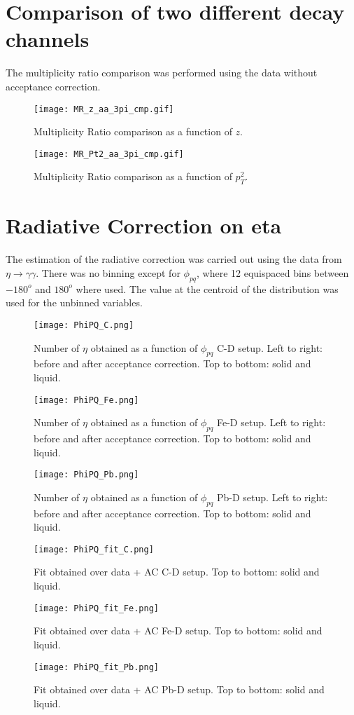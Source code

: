 \section{Comparison of two different decay channels}
The multiplicity ratio comparison was performed using the data without acceptance correction.
%
\begin{figure}[H]
\centering
\texttt{[image: MR\_z\_aa\_3pi\_cmp.gif]}
\caption{Multiplicity Ratio comparison as a function of $z$.}
\label{fig:MR_eta_cmp_z}
\end{figure}
%
\begin{figure}[H]
\centering
\texttt{[image: MR\_Pt2\_aa\_3pi\_cmp.gif]}
\caption{Multiplicity Ratio comparison as a function of $p_T^2$.}
\label{fig:MR_eta_cmp_pt2}
\end{figure}

\section{Radiative Correction on eta}
The estimation of the radiative correction was carried out using the data from $\eta \rightarrow \gamma\gamma$. There was no binning except for $\phi_{pq}$, where 12 equispaced bins between $-180^o$ and $180^o$ where used. The value at the centroid of the distribution was used for the unbinned variables. 

\begin{figure}[H]
\centering
\texttt{[image: PhiPQ\_C.png]}
\caption{Number of $\eta$ obtained as a function of $\phi_{pq}$ C-D setup. Left to right: before and after acceptance correction. Top to bottom: solid and liquid.}
\label{fig:Nh_eta_aa_phipq_C}
\end{figure}
%
\begin{figure}[H]
\centering
\texttt{[image: PhiPQ\_Fe.png]}
\caption{Number of $\eta$ obtained as a function of $\phi_{pq}$ Fe-D setup. Left to right: before and after acceptance correction. Top to bottom: solid and liquid.}
\label{fig:Nh_eta_aa_phipq_Fe}
\end{figure}
%
\begin{figure}[H]
\centering
\texttt{[image: PhiPQ\_Pb.png]}
\caption{Number of $\eta$ obtained as a function of $\phi_{pq}$ Pb-D setup. Left to right: before and after acceptance correction. Top to bottom: solid and liquid.}
\label{fig:Nh_eta_aa_phipq_Pb}
\end{figure}
%
\begin{figure}[H]
\centering
\texttt{[image: PhiPQ\_fit\_C.png]}
\caption{Fit obtained over data + AC C-D setup. Top to bottom: solid and liquid.}
\label{fig:fit_eta_aa_phipq_C}
\end{figure}
%
\begin{figure}[H]
\centering
\texttt{[image: PhiPQ\_fit\_Fe.png]}
\caption{Fit obtained over data + AC Fe-D setup. Top to bottom: solid and liquid.}
\label{fig:fit_eta_aa_phipq_Fe}
\end{figure}
%
\begin{figure}[H]
\centering
\texttt{[image: PhiPQ\_fit\_Pb.png]}
\caption{Fit obtained over data + AC Pb-D setup. Top to bottom: solid and liquid.}
\label{fig:fit_eta_aa_phipq_Pb}
\end{figure}


